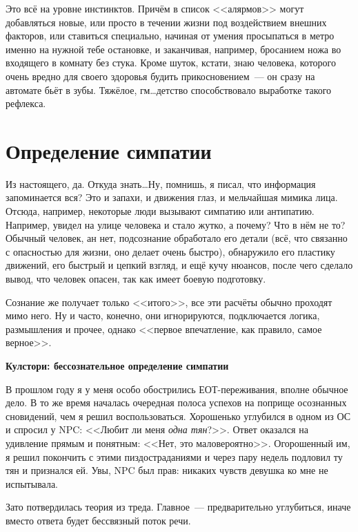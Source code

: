 \documentclass[a5paper,12pt,twoside]{memoir}
\begin{document}
Это всё на уровне инстинктов. Причём в список <<алярмов>> могут добавляться новые, или просто в течении жизни под воздействием внешних факторов, или ставиться специально, начиная от умения просыпаться в метро именно на нужной тебе остановке, и заканчивая, например, бросанием ножа во входящего в комнату без стука. Кроме шуток, кстати, знаю человека, которого очень вредно для своего здоровья будить прикосновением~--- он сразу на автомате бьёт в зубы. Тяжёлое, гм\ldots детство способствовало выработке такого рефлекса. 


\section{Определение симпатии}

\medskip
Из настоящего, да. Откуда знать\ldots Ну, помнишь, я писал, что информация запоминается вся? Это и запахи, и движения глаз, и мельчайшая мимика лица. Отсюда, например, некоторые люди вызывают симпатию или антипатию. Например, увидел на улице человека и стало жутко, а почему? Что в нём не то? Обычный человек, ан нет, подсознание обработало его детали (всё, что связанно с опасностью для жизни, оно делает очень быстро), обнаружило его пластику движений, его быстрый и цепкий взгляд, и ещё кучу нюансов, после чего сделало вывод, что человек опасен, так как имеет боевую подготовку.

Сознание же получает только <<итого>>, все эти расчёты обычно проходят мимо него. Ну и часто, конечно, они игнорируются, подключается логика, размышления и прочее, однако <<первое впечатление, как правило, самое верное>>.

\begin{shaded}

\begin{center}
\Large\bfseries{Кулстори: бессознательное определение симпатии}
\end{center}

В прошлом году я у меня особо обострились ЕОТ-переживания, вполне обычное дело. В то же время началась очередная полоса успехов на поприще осознанных сновидений, чем я решил воспользоваться. Хорошенько углубился в одном из ОС и спросил у NPC: <<Любит ли меня \textit{одна тян}?>>. Ответ оказался на удивление прямым и понятным: <<Нет, это маловероятно>>. Огорошенный им, я решил покончить с этими пиздостраданиями и через пару недель подловил ту тян и признался ей. Увы, NPC был прав: никаких чувств девушка ко мне не испытывала. 

Зато потвердилась теория из треда. Главное~--- предварительно углубиться, иначе вместо ответа будет бессвязный поток речи.

\end{shaded}
\end{document}
